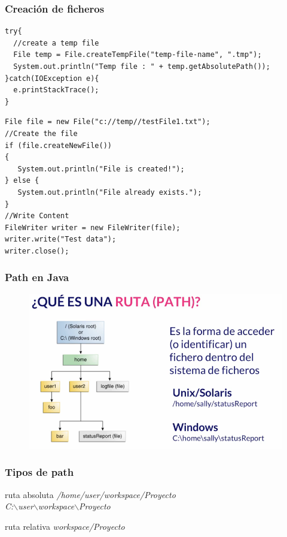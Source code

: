 \documentclass{beamer}
\begin{document}
\begin{frame}[fragile]
\frametitle{Creación de ficheros}
\begin{footnotesize}

\begin{verbatim}
try{
  //create a temp file
  File temp = File.createTempFile("temp-file-name", ".tmp"); 
  System.out.println("Temp file : " + temp.getAbsolutePath());
}catch(IOException e){
  e.printStackTrace();
}
\end{verbatim}
\pause
\begin{verbatim}
File file = new File("c://temp//testFile1.txt");
//Create the file
if (file.createNewFile())
{
   System.out.println("File is created!");
} else {
   System.out.println("File already exists.");
}
//Write Content
FileWriter writer = new FileWriter(file);
writer.write("Test data");
writer.close();
\end{verbatim}
\end{footnotesize}
\end{frame}



\begin{frame}
\frametitle{Path en Java}
\begin{figure}
\includegraphics[scale=0.5]{imagenes/path.png}
\end{figure}
\end{frame}


\begin{frame}
\frametitle{Tipos de path}
\begin{block}{ruta absoluta}
\emph{/home/user/workspace/Proyecto\\
C:$\backslash$user$\backslash$workspace$\backslash$Proyecto}
\end{block}
\pause
\begin{block}{ruta relativa}
\emph{workspace/Proyecto}
\end{block}
\end{frame}
\end{document}
